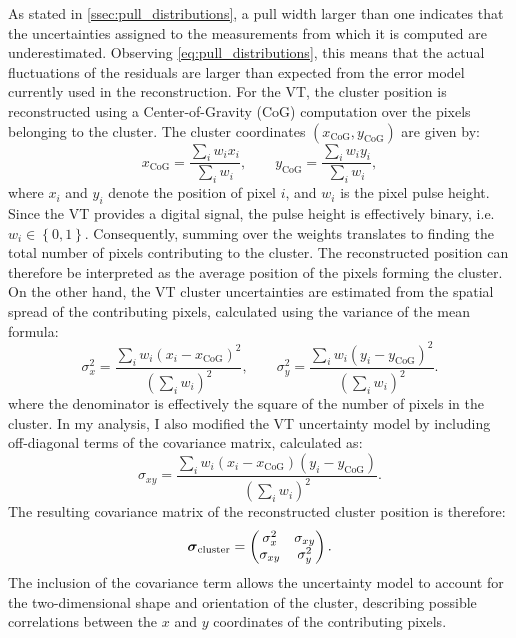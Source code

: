 As stated in \autoref{ssec:pull_distributions}, a pull width larger than one indicates that the uncertainties assigned to the measurements from which it is computed are underestimated. Observing \autoref{eq:pull_distributions}, this means that the actual fluctuations of the residuals are larger than expected from the error model currently used in the reconstruction. For the VT, the cluster position is reconstructed using a Center-of-Gravity (CoG) computation over the pixels belonging to the cluster. The cluster coordinates $(x_{\mathrm{CoG}},y_{\mathrm{CoG}})$ are given by:
\begin{equation}
	x_{\mathrm{CoG}} =
	\frac{\displaystyle\sum_i w_i x_i}
	{\displaystyle\sum_i w_i},
	\qquad
	y_{\mathrm{CoG}} =
	\frac{\displaystyle\sum_i w_i y_i}
	{\displaystyle\sum_i w_i},
	\label{eq:cluster_VT}
\end{equation}
where $x_i$ and $y_i$ denote the position of pixel $i$, and $w_i$ is the pixel pulse height. Since the VT provides a digital signal, the pulse height is effectively binary, i.e. $w_i \in \left\{0,1\right\}$. Consequently, summing over the weights translates to finding the total number of pixels contributing to the cluster. The reconstructed position can therefore be interpreted as the average position of the pixels forming the cluster. On the other hand, the VT cluster uncertainties are estimated from the spatial spread of the contributing pixels, calculated using the variance of the mean formula:
\begin{equation}
	\sigma_x^2 =
	\frac{\displaystyle\sum_i w_i
		(x_i-x_{\mathrm{CoG}})^2}
	{\displaystyle\left(\sum_i w_i\right)^2},
	\qquad
	\sigma_y^2 =
	\frac{\displaystyle\sum_i w_i
		(y_i-y_{\mathrm{CoG}})^2}
	{\displaystyle\left(\sum_i w_i\right)^2}.
	\label{eq:cluster_VT_err}
\end{equation}
where the denominator is effectively the square of the number of pixels in the cluster. In my analysis, I also modified the VT uncertainty model by including off-diagonal terms of the covariance matrix, calculated as:
\begin{equation}
	\sigma_{xy} =
	\frac{\displaystyle\sum_i w_i
		(x_i-x_{\mathrm{CoG}})
		(y_i-y_{\mathrm{CoG}})}
	{\displaystyle\left(\sum_i w_i\right)^2}.
	\label{eq:cluster_VT_err_cov}
\end{equation}
The resulting covariance matrix of the reconstructed cluster position is therefore:
\begin{equation}
	\boldsymbol{\sigma}_{\mathrm{cluster}} =
	\begin{pmatrix}
		\sigma_x^2 & \sigma_{xy} \\
		\sigma_{xy} & \sigma_y^2
	\end{pmatrix}.
	\label{eq:VT_cov_mat}
\end{equation}
The inclusion of the covariance term allows the uncertainty model to account for the two-dimensional shape and orientation of the cluster, describing possible correlations between the $x$ and $y$ coordinates of the contributing pixels.

